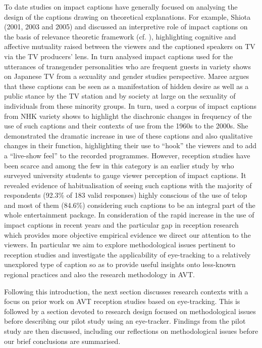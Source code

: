 \documentclass[output=paper]{langsci/langscibook}
\begin{document}
To date studies on impact captions have generally focused on analysing the design of the captions drawing on theoretical explanations. For example, Shiota (2001, 2003 and 2005) and \citet{Sasamoto2014} discussed an interpretive role of impact captions on the basis of relevance theoretic framework (cf. \citealt{Sperber1986second}), highlighting cognitive and affective mutuality raised between the viewers and the captioned speakers on TV via the TV producers' lens. In turn \citet{Maree2014} analysed impact captions used for the utterances of transgender personalities who are frequent guests in variety shows on Japanese TV from a sexuality and gender studies perspective. Maree argues that these captions can be seen as a manifestation of hidden desire as well as a public stance by the TV station and by society at large on the sexuality of individuals from these minority groups. In turn, \citet{Shitara2012} used a corpus of impact captions from NHK variety shows to highlight the diachronic changes in frequency of the use of such captions and their contexts of use from the 1960s to the 2000s. She demonstrated the dramatic increase in use of these captions and also qualitative changes in their function, highlighting their use to ``hook'' the viewers and to add a ``live-show feel'' to the recorded programmes. However, reception studies have been scarce and among the few in this category is an earlier study by \citet{Kimura2000} who surveyed university students to gauge viewer perception of impact captions. It revealed evidence of habitualisation of seeing such captions with the majority of respondents (92.3\% of 183 valid responses) highly conscious of the use of telop and most of them (84.6\%) considering such captions to be an integral part of the whole entertainment package. In consideration of the rapid increase in the use of impact captions in recent years \citep[50]{Kato2012} and the particular gap in reception research which provides more objective empirical evidence we direct our attention to the viewers. In particular we aim to explore methodological issues pertinent to reception studies and investigate the applicability of eye-tracking to a relatively unexplored type of caption so as to provide useful insights onto less-known regional practices and also the research methodology in AVT.  



Following this introduction, the next section discusses research contexts with a focus on prior work on AVT reception studies based on eye-tracking. This is followed by a section devoted to research design focused on methodological issues before describing our pilot study using an eye-tracker. Findings from the pilot study are then discussed, including our reflections on methodological issues before our brief conclusions are summarised. 
\end{document}
